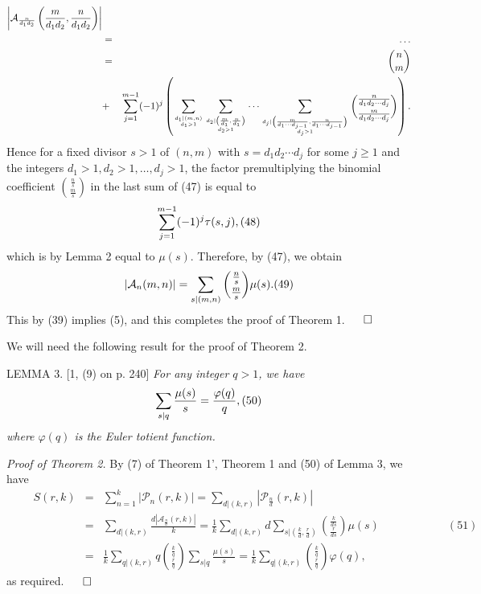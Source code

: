 \documentclass[12pt]{amsart}
\begin{document}
{\begin{eqnarray*}
\left|{\mathcal A}_{\frac{n}{d_1d_2}}\left(\frac{m}{d_1d_2},\frac{n}{d_1d_2}
\right)\right|\\
&=&\ldots \\
&=&
{n \choose m}\\
&+&\sum_{j=1}^{m-1}(-1)^{j}\left(\sum_{d_1|(m,n)\atop d_1>1}
\sum_{d_2|\left(\frac{m}{d_1},\frac{n}{d_1}\right)\atop d_2>1}\cdots
\sum_{d_j|\left(\frac{m}{d_1\cdots d_{j-1}},\frac{n}{d_1\cdots 
d_{j-1}}\right)\atop d_j>1}
{\frac{n}{d_1d_2\cdots d_{j}}\choose\frac{m}{d_1d_2\cdots d_{j}}}\right).
\end{eqnarray*} 
Hence for a fixed divisor $s>1$  of $(n,m)$ with $s=d_1d_2\cdots d_{j}$ for 
some $j\ge 1$ and the integers $d_1>1,d_2>1,\ldots ,d_j>1$, 
the factor premultiplying the binomial coefficient ${\frac{n}{s}\choose
\frac{m}{s}}$
in the last sum of (47)  is equal to
    $$
\sum_{j=1}^{m-1}(-1)^{j}\tau(s,j),\relax(48)
 $$
which  is by Lemma 2 equal to  $\mu(s)$. Therefore, by  (47), we obtain
  $$
|{\mathcal A}_n(m,n)|= \sum_{s|(m,n)}{\frac{n}{s}\choose\frac{m}{s}}\mu(s).
\relax(49)
 $$
This by (39) implies (5), and this completes the proof of Theorem 1.
\hfill$\qed$

\vspace{2mm}

 We will need the following result for the proof of Theorem 2.  
\vspace{2mm}

L{\scriptsize EMMA} 3. [1, (9) on p. 240]
{\it For any integer $q> 1$, we have
    $$
\sum_{s|q}\frac{\mu(s)}{s}=\frac{\varphi(q)}{q},\relax(50)
 $$
where $\varphi(q)$ is the Euler  totient function.}

\vspace{2mm}




{\it Proof of Theorem 2.} By (7) of Theorem 1', Theorem 1 and (50) of 
Lemma 3, we have
  \begin{eqnarray*}
\qquad S(r,k)&=&\sum_{n=1}^{k}|{\mathcal P}_n(r,k)|=\sum_{d|(k,r)}
\left|{\mathcal P}_{\frac{n}{d}}(r,k)\right|\\
\qquad\qquad  &=&\sum_{d|(k,r)}
\frac{d\left|{\mathcal A}_{\frac{n}{d}}(r,k)\right|}{k}=\frac{1}{k}\sum_{d|(k,r)}d
\sum_{s|\left(\frac{k}{d},\frac{r}{d}\right)}{\frac{k}{ds}\choose
\frac{r}{ds}}\mu(s)\qquad\qquad\qquad (51)\\
&=&\frac{1}{k}\sum_{q|(k,r)}q{\frac{k}{q}\choose
\frac{r}{q}}\sum_{s|q}\frac{\mu(s)}{s}=\frac{1}{k}\sum_{q|(k,r)}{\frac{k}{q}
\choose\frac{r}{q}}\varphi(q),
  \end{eqnarray*} 
as required. \hfill$\qed$

}
\end{document}
